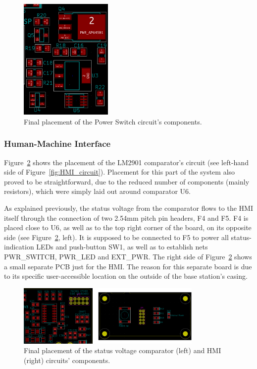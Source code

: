 \begin{figure}[h]
	\centering
	\includegraphics[width=0.4\textwidth]{Chapters/Figures/chapter5/placement_PowerSwitch.png}
	\caption{Final placement of the Power Switch circuit's components.}
	\label{fig:placement_PowerSwitch}
\end{figure}


\subsubsection{Human-Machine Interface}\label{sec:5116_HMI}

Figure~\ref{fig:placement_HMI} shows the placement of the LM2901 comparator's circuit (see left-hand side of Figure~\ref{fig:HMI_circuit}).
Placement for this part of the system also proved to be straightforward, due to the reduced number of components (mainly resistors), which were simply laid out around comparator U6.

As explained previously, the status voltage from the comparator flows to the HMI itself through the connection of two 2.54mm pitch pin headers, F4 and F5. F4 is placed close to U6, as well as to the top right corner of the board, on its opposite side (see Figure~\ref{fig:placement_HMI}, left). It is supposed to be connected to F5 to power all status-indication LEDs and push-button SW1, as well as to establish nets PWR\_SWITCH, PWR\_LED and EXT\_PWR. The right side of Figure~\ref{fig:placement_HMI} shows a small separate PCB just for the HMI. The reason for this separate board is due to its specific user-accessible location on the outside of the base station's casing.

\begin{figure}[h]
	\centering
	\includegraphics[width=0.8\textwidth]{Chapters/Figures/chapter5/placement_HMI.png}
	\caption{Final placement of the status voltage comparator (left) and HMI (right) circuits' components.}
	\label{fig:placement_HMI}
\end{figure}


